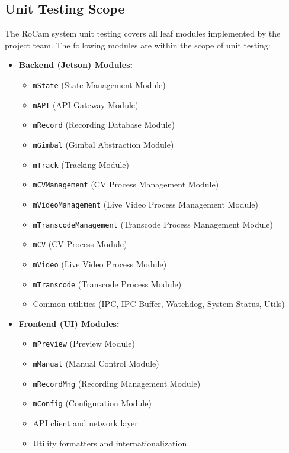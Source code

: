 \documentclass[12pt, titlepage]{article}
\newcommand{\mref}[1]{\texttt{#1}}
\begin{document}
\subsection{Unit Testing Scope}

The RoCam system unit testing covers all leaf modules implemented by the
project team. The following modules are within the scope of unit testing:

\begin{itemize}
  \item \textbf{Backend (Jetson) Modules:}
        \begin{itemize}
          \item \mref{mState} (State Management Module)
          \item \mref{mAPI} (API Gateway Module)
          \item \mref{mRecord} (Recording Database Module)
          \item \mref{mGimbal} (Gimbal Abstraction Module)
          \item \mref{mTrack} (Tracking Module)
          \item \mref{mCVManagement} (CV Process Management Module)
          \item \mref{mVideoManagement} (Live Video Process Management Module)
          \item \mref{mTranscodeManagement} (Transcode Process Management Module)
          \item \mref{mCV} (CV Process Module)
          \item \mref{mVideo} (Live Video Process Module)
          \item \mref{mTranscode} (Transcode Process Module)
          \item Common utilities (IPC, IPC Buffer, Watchdog, System Status, Utils)
        \end{itemize}

  \item \textbf{Frontend (UI) Modules:}
        \begin{itemize}
          \item \mref{mPreview} (Preview Module)
          \item \mref{mManual} (Manual Control Module)
          \item \mref{mRecordMng} (Recording Management Module)
          \item \mref{mConfig} (Configuration Module)
          \item API client and network layer
          \item Utility formatters and internationalization
        \end{itemize}
\end{itemize}
\end{document}

